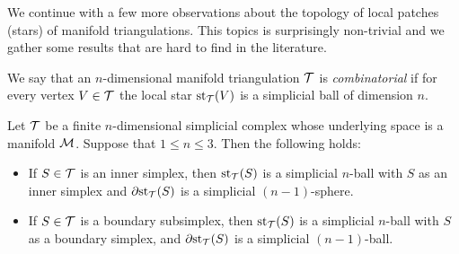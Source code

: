\documentclass[10pt,letterpaper]{article}
\begin{document}
We continue with a few more observations about the topology of local patches (stars) of manifold triangulations. This topics is surprisingly non-trivial and 
we gather some results that are hard to find in the literature. 

We say that an $n$-dimensional manifold triangulation ${\mathcal T}$ is \emph{combinatorial}
if for every vertex $V \in {\mathcal T}$ the local star $\operatorname{st}_{{\mathcal T}}(V)$ is a simplicial ball of dimension $n$. 

\begin{lemma}\label{lemma:startopology}
    Let ${\mathcal T}$ be a finite $n$-dimensional simplicial complex whose underlying space is a manifold ${\mathcal M}$.
    Suppose that $1 \leq n \leq 3$. Then the following holds:
    \begin{itemize}
        \item
        If $S \in {\mathcal T}$ is an inner simplex, 
        then $\operatorname{st}_{{\mathcal T}}(S)$ is a simplicial $n$-ball with $S$ as an inner simplex
        and ${\partial \rm st}_{{\mathcal T}}(S)$ is a simplicial $(n-1)$-sphere. 
        \item
        If $S \in {\mathcal T}$ is a boundary subsimplex, 
        then $\operatorname{st}_{{\mathcal T}}(S)$ is a simplicial $n$-ball with $S$ as a boundary simplex,
        and ${\partial \rm st}_{{\mathcal T}}(S)$ is a simplicial $(n-1)$-ball.
    \end{itemize}
\end{lemma}
\end{document}
